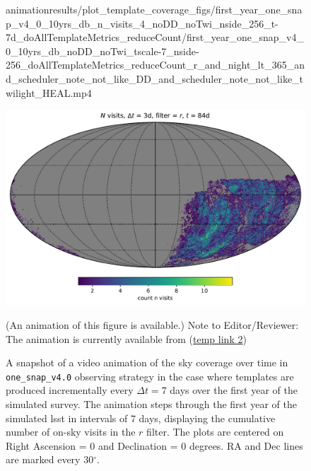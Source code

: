 \documentclass[preprintm,linenumbers]{aastex631}
\newcommand{\baseline}{\texttt{one\_snap\_v4.0}\xspace}
\begin{document}
		\begin{figure}
			\begin{center}
				\begin{interactive}{animation}{results/plot_template_coverage_figs/first_year_one_snap_v4_0_10yrs_db_n_visits_4_noDD_noTwi_nside_256_t-7d_doAllTemplateMetrics_reduceCount/first_year_one_snap_v4_0_10yrs_db_noDD_noTwi_tscale-7_nside-256_doAllTemplateMetrics_reduceCount_r_and_night_lt_365_and_scheduler_note_not_like_DD_and_scheduler_note_not_like_twilight_HEAL.mp4}
				\end{interactive}
				\includegraphics[width=0.5\columnwidth]{results/first_year_one_snap_v4_0_10yrs_db_noDD_noTwi_tscale-3_nside-256_doAllTemplateMetrics_reduceCount_r_and_night_lt_84_and_scheduler_note_not_like_DD_and_scheduler_note_not_like_twilight_HEAL.pdf}
				\caption{A snapshot of a video animation of the sky coverage over time in \baseline observing strategy in the case where templates are produced incrementally every $\Delta t = 7$ days over the first year of the simulated survey.  
    The animation steps through the first year of the simulated \gls*{lsst} in intervals of 7 days, displaying the cumulative number of on-sky visits in the $r$ filter. 
    The plots are centered on Right Ascension = 0 and Declination = 0 degrees. RA and Dec lines are marked every 30$^\circ$.} (An animation of this figure is available.) Note to Editor/Reviewer: The animation is currently available from (\href{https://cuillin.roe.ac.uk/~jrobinson/LSST-Incremental-Templates-Analysis-Paper_4_0/first_year_one_snap_v4_0_10yrs_db_noDD_noTwi_tscale-7_nside-256_doAllTemplateMetrics_reduceCount_r_and_night_lt_365_and_scheduler_note_not_like_DD_and_scheduler_note_not_like_twilight_HEAL.mp4}{temp link 2}) \label{animation:7days}
			\end{center}
		\end{figure}
		
\end{document}
